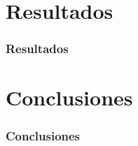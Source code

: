 \documentclass{beamer}
\begin{document}
\section{Resultados}
\begin{frame}

\frametitle{Resultados}

\end{frame}

\section{Conclusiones}
\begin{frame}

\frametitle{Conclusiones}
\end{frame}
\end{document}
